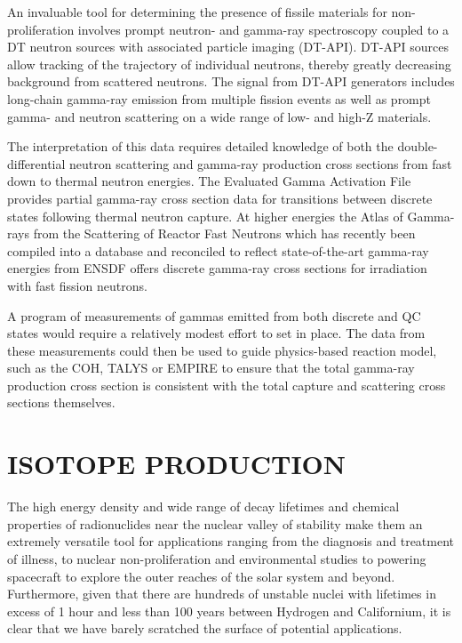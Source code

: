 \documentclass[letterpaper,draft]{ar-1col}
\begin{document}
An invaluable tool for determining the presence of fissile materials for non-proliferation involves prompt neutron- and gamma-ray spectroscopy coupled to a DT neutron sources with associated particle imaging (DT-API).   DT-API sources allow tracking of the trajectory of individual neutrons, thereby greatly decreasing background from scattered neutrons.  The signal from DT-API generators includes long-chain gamma-ray emission from multiple fission events \cite{Pra12,Nak10} as well as prompt gamma- and neutron scattering on a wide range of low- and high-Z materials.   

The interpretation of this data requires detailed knowledge of both the double-differential neutron scattering and gamma-ray production cross sections from fast down to thermal neutron energies.  The Evaluated Gamma Activation File \cite{Fir14} provides partial gamma-ray cross section data for transitions between discrete states following thermal neutron capture.  At higher energies the Atlas of Gamma-rays from the Scattering of Reactor Fast Neutrons \cite{Dem78} which has recently been compiled into a database and reconciled to reflect state-of-the-art gamma-ray energies from ENSDF \cite{Hur18} offers discrete gamma-ray cross sections for irradiation with fast fission neutrons.  

A program of measurements of gammas emitted from both discrete and QC states would require a relatively modest effort to set in place.  The data from these measurements could then be used to guide physics-based reaction model, such as the COH, TALYS or EMPIRE to ensure that the total gamma-ray production cross section is consistent with the total capture and scattering cross sections themselves. 


\section{ISOTOPE PRODUCTION}\label{sec:isotope_production}


The high energy density and wide range of decay lifetimes and chemical properties of radionuclides near the nuclear valley of stability make them an extremely versatile tool for applications ranging from the diagnosis and treatment of illness, to nuclear non-proliferation and environmental studies to powering spacecraft to explore the outer reaches of the solar system and beyond. Furthermore, given that there are hundreds of unstable nuclei with lifetimes in excess of 1 hour and less than 100 years between Hydrogen and Californium, it is clear that we have barely scratched the surface of potential applications.
\end{document}
